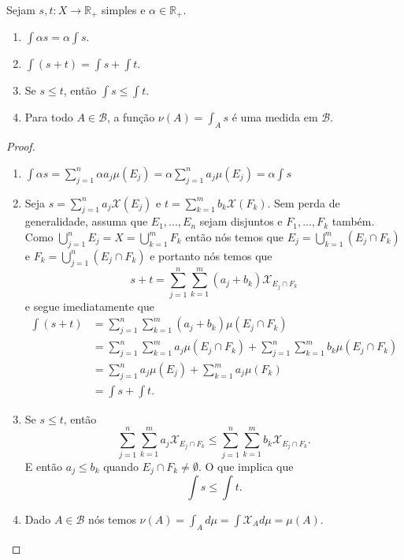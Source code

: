 \begin{proposicao}
    Sejam $s,t: X \to \mathbb{R}_+$ simples e $\alpha \in \mathbb{R}_+$. 
    \begin{enumerate}[label=(\roman*)]
        \item  $\int \alpha s  =  \alpha \int s$.
        \item  $\int (s + t)  =  \int s + \int t$.
        \item  Se $s \leq t$, então $\int s \leq \int t$.
        \item Para todo $A \in \mathcal{B}$, a função $\nu(A) = \int_A s$ é uma medida em $\mathcal{B}$. 
    \end{enumerate}
    \begin{proof}
        \begin{enumerate}[label=(\roman*)]
            \item 
            $\int \alpha s = \sum _{j=1}^n \alpha a_j \mu{(E_j)} = \alpha \sum _{j=1}^n  a_j \mu{(E_j)} = \alpha \int  s $ 
            
            \item Seja $s = \sum _{j=1}^n a_j \mathcal{X}(E_j)$ e $t = \sum _{k=1}^m b_k \mathcal{X}(F_k)$. Sem perda de generalidade, assuma que $E_1,...,E_n$ sejam disjuntos e $F_1, ..., F_k$ também. Como $\bigcup_{j=1} ^n E_j = X = \bigcup_{k=1} ^m F_k $ então nós temos que $E_j = \bigcup_{k=1} ^m(E_j \cap F_k)$ e $F_k = \bigcup_{j=1} ^n(E_j \cap F_k)$ e portanto nós temos que 
            \[ s + t = \sum _{j=1}^n \sum _{k=1}^m (a_j + b_k) \mathcal{X}_{E_j \cap F_k} \] 
            e segue imediatamente que
            \begin{align*}
                \int (s+t) & = \sum _{j=1}^n \sum _{k=1}^m (a_j + b_k) \mu(E_j \cap F_k) \\
                & = \sum _{j=1}^n \sum _{k=1}^m a_j \mu(E_j \cap F_k) + \sum _{j=1}^n \sum _{k=1}^m b_k \mu(E_j \cap F_k) \\
                & = \sum _{j=1}^n a_j \mu(E_j ) +
                \sum _{k=1}^m a_j \mu(F_k)  \\
                & = \int s + \int t.
            \end{align*}

            \item Se $s \leq t$, então 
            \[
                \sum _{j=1}^n \sum _{k=1}^m a_j \mathcal{X}_{E_j \cap F_k} \leq \sum _{j=1}^n \sum _{k=1}^m b_k \mathcal{X}_{E_j \cap F_k}.   
            \]
            E então $a_j \leq b_k$ quando $E_j \cap F_k \neq \emptyset$. O que implica que 
            \[
            \int s \leq \int t.    
            \]
            
            \item Dado $A \in \mathcal{B}$ nós temos $ \nu(A) = \int_A d \mu = \int \mathcal{X}_A d \mu = \mu(A)$.
            
        \end{enumerate} 
    \end{proof}
\end{proposicao}

